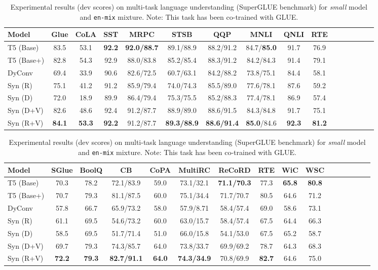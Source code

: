 \documentclass{article}
\begin{document}
\begin{table*}[t]
\small
    \centering
    \begin{tabular}{l|c|cccccccccccccc}
    \toprule
        Model &	Glue &	CoLA&	SST&	MRPC	&STSB &QQP&	MNLI&	QNLI&	RTE \\ 
        \midrule
T5 (Base)
& 83.5 &	53.1 &	\textbf{92.2} &	\textbf{92.0/88.7} &	89.1/88.9 &	88.2/91.2 &	84.7/\textbf{85.0} &	91.7 &	76.9 \\ 
T5 (Base+) & 82.8 &	54.3&	92.9&	88.0/83.8 &	85.2/85.4 &	88.3/91.2 &	84.2/84.3 &	91.4	&79.1\\
DyConv & 69.4 &	33.9 & 	90.6 & 82.6/72.5 & 60.7/63.1 & 84.2/88.2 & 73.8/75.1	& 84.4 &	58.1 \\
\midrule
Syn (R) & 75.1 & 	41.2 &	91.2 & 85.9/79.4 & 74.0/74.3 & 85.5/89.0 & 77.6/78.1 &87.6 &	59.2 \\
Syn (D) & 72.0 &	18.9 &	89.9 & 86.4/79.4 &	75.3/75.5 &	85.2/88.3 &	77.4/78.1 &	86.9& 	57.4 \\
Syn (D+V) & 82.6 &	48.6 &	92.4 &	91.2/87.7 &	88.9/89.0 &	88.6/91.5 &	84.3/84.8	&91.7 &	75.1 \\
Syn (R+V)	& \textbf{84.1} &	\textbf{53.3} &	\textbf{92.2} & 91.2/87.7 & \textbf{89.3/88.9} & \textbf{88.6/91.4} & \textbf{85.0}/84.6	& \textbf{92.3} & 	\textbf{81.2} \\
\bottomrule
    \end{tabular}
    \caption{Experimental results (dev scores) on multi-task language understanding (GLUE benchmark) for \textit{small} model and \texttt{en-mix} mixture. Note: This task has been co-trained with SuperGLUE.}
    \label{tab:glue}
    \centering
    \begin{tabular}{l|c|cccccccccccccc}
    \toprule
        Model &	SGlue &	BoolQ &	CB & 	CoPA & MultiRC &	ReCoRD &	RTE & 	WiC &	WSC \\ 
        \midrule
T5 (Base) &	70.3 &	78.2 &	72.1/83.9 &	59.0 &	73.1/32.1 &
\textbf{71.1/70.3}	& 77.3	& \textbf{65.8} &\textbf{80.8}\\
T5 (Base+) & 70.7 &	79.3 &	81.1/87.5 &	60.0 &	75.1/34.4	& 71.7/70.7 &	80.5 & 64.6	 &71.2\\ 
DyConv & 57.8 &	66.7 &	65.9/73.2&	58.0	& 57.9/8.71 &	58.4/57.4 & 	69.0 &	58.6 &	73.1 \\
\midrule
Syn (R) &	61.1 &	69.5 &	54.6/73.2 &	60.0	& 63.0/15.7 &	58.4/57.4 &	67.5 & 	64.4 &	66.3 \\
Syn (D) & 58.5 &	69.5 & 51.7/71.4 &	51.0 &	66.0/15.8	& 54.1/53.0 &	67.5 &	65.2 &	58.7 \\
Syn (D+V) & 69.7 &	79.3 &74.3/85.7	& 64.0 & 73.8/33.7 &	69.9/69.2 &	78.7 &	64.3	 &68.3 \\
Syn (R+V) &	\textbf{72.2} &	\textbf{79.3} &	\textbf{82.7/91.1} &	\textbf{64.0} &	\textbf{74.3/34.9} &	70.8/69.9	& \textbf{82.7} &	64.6 &	75.0 \\
        \bottomrule
    \end{tabular}
    \caption{Experimental results (dev scores) on multi-task language understanding (SuperGLUE benchmark) for \textit{small} model and \texttt{en-mix} mixture. Note: This task has been co-trained with GLUE.}
    \label{tab:superglue}
\end{table*}
\end{document}
